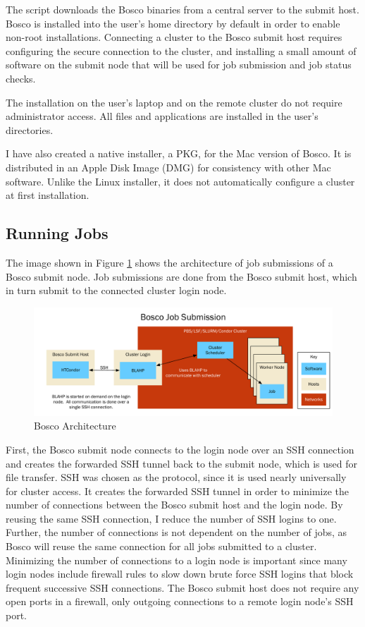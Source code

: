 The script downloads the Bosco binaries from a central server to the submit host.  Bosco is installed into the user's home directory by default in order to enable non-root installations.  Connecting a cluster to the Bosco submit host requires configuring the secure connection to the cluster, and installing a small amount of software on the submit node that will be used for job submission and job status checks.

The installation on the user's laptop and on the remote cluster do not require administrator access.  All files and applications are installed in the user's directories.

I have also created a native installer, a PKG, for the Mac version of Bosco.  It is distributed in an Apple Disk Image (DMG) for consistency with other Mac software.  Unlike the Linux installer, it does not automatically configure a cluster at first installation.


\subsection{Running Jobs}

The image shown in Figure \ref{fig:archgraph1} shows the architecture of job submissions of a Bosco submit node.  Job submissions are done from the Bosco submit host, which in turn submit to the connected cluster login node.  

\begin{figure}
\includegraphics[width=\textwidth]{images/ArchitectureGraph1}
\caption{Bosco Architecture}
\label{fig:archgraph1}
\end{figure}
\afterpage{\clearpage}

First, the Bosco submit node connects to the login node over an SSH connection and creates the forwarded SSH tunnel back to the submit node, which is used for file transfer.  SSH was chosen as the protocol, since it is used nearly universally for cluster access.  It creates the forwarded SSH tunnel in order to minimize the number of connections between the Bosco submit host and the login node.  By reusing the same SSH connection, I reduce the number of SSH logins to one.  Further, the number of connections is not dependent on the number of jobs, as Bosco will reuse the same connection for all jobs submitted to a cluster.  Minimizing the number of connections to a login node is important since many login nodes include firewall rules to slow down brute force SSH logins that block frequent successive SSH connections.  The Bosco submit host does not require any open ports in a firewall, only outgoing connections to a remote login node's SSH port.

